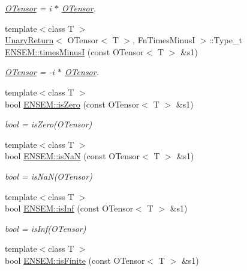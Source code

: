 \begin{DoxyCompactItemize}
\begin{DoxyCompactList}\small\item\em \mbox{\hyperlink{classENSEM_1_1OTensor}{O\+Tensor}} = i $\ast$ \mbox{\hyperlink{classENSEM_1_1OTensor}{O\+Tensor}}. \end{DoxyCompactList}\item 
{\footnotesize template$<$class T $>$ }\\\mbox{\hyperlink{structUnaryReturn}{Unary\+Return}}$<$ O\+Tensor$<$ T $>$, Fn\+Times\+MinusI $>$\+::Type\+\_\+t \mbox{\hyperlink{group__obstensor_ga2ff1b1b26805ce37116135e8474f4b36}{E\+N\+S\+E\+M\+::times\+MinusI}} (const O\+Tensor$<$ T $>$ \&s1)
\begin{DoxyCompactList}\small\item\em \mbox{\hyperlink{classENSEM_1_1OTensor}{O\+Tensor}} = -\/i $\ast$ \mbox{\hyperlink{classENSEM_1_1OTensor}{O\+Tensor}}. \end{DoxyCompactList}\item 
{\footnotesize template$<$class T $>$ }\\bool \mbox{\hyperlink{group__obstensor_ga9520741647696623fb9f0d8398f50568}{E\+N\+S\+E\+M\+::is\+Zero}} (const O\+Tensor$<$ T $>$ \&s1)
\begin{DoxyCompactList}\small\item\em bool = is\+Zero(\+O\+Tensor) \end{DoxyCompactList}\item 
{\footnotesize template$<$class T $>$ }\\bool \mbox{\hyperlink{group__obstensor_ga24d19fade61896ac0c88639bd7b00b5a}{E\+N\+S\+E\+M\+::is\+NaN}} (const O\+Tensor$<$ T $>$ \&s1)
\begin{DoxyCompactList}\small\item\em bool = is\+Na\+N(\+O\+Tensor) \end{DoxyCompactList}\item 
{\footnotesize template$<$class T $>$ }\\bool \mbox{\hyperlink{group__obstensor_ga67d316c95a82bf37cc7607cd64e039a1}{E\+N\+S\+E\+M\+::is\+Inf}} (const O\+Tensor$<$ T $>$ \&s1)
\begin{DoxyCompactList}\small\item\em bool = is\+Inf(\+O\+Tensor) \end{DoxyCompactList}\item 
{\footnotesize template$<$class T $>$ }\\bool \mbox{\hyperlink{group__obstensor_ga79f475f3909487c15b04b4561acc06ef}{E\+N\+S\+E\+M\+::is\+Finite}} (const O\+Tensor$<$ T $>$ \&s1)

\end{DoxyCompactItemize}

